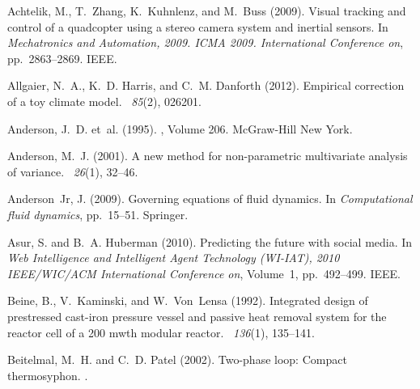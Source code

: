 \documentclass[12pt]{report}
\begin{document}

\begin{thebibliography}{}

Achtelik, M., T.~Zhang, K.~Kuhnlenz, and M.~Buss (2009).
\newblock Visual tracking and control of a quadcopter using a stereo camera
  system and inertial sensors.
\newblock In {\em Mechatronics and Automation, 2009. ICMA 2009. International
  Conference on}, pp.\  2863--2869. IEEE.

Allgaier, N.~A., K.~D. Harris, and C.~M. Danforth (2012).
\newblock Empirical correction of a toy climate model.
~{\em 85\/}(2), 026201.

Anderson, J.~D. et~al. (1995).
, Volume 206.
\newblock McGraw-Hill New York.

Anderson, M.~J. (2001).
\newblock A new method for non-parametric multivariate analysis of variance.
~{\em 26\/}(1), 32--46.

Anderson~Jr, J. (2009).
\newblock Governing equations of fluid dynamics.
\newblock In {\em Computational fluid dynamics}, pp.\  15--51. Springer.

Asur, S. and B.~A. Huberman (2010).
\newblock Predicting the future with social media.
\newblock In {\em Web Intelligence and Intelligent Agent Technology (WI-IAT),
  2010 IEEE/WIC/ACM International Conference on}, Volume~1, pp.\  492--499.
  IEEE.

Beine, B., V.~Kaminski, and W.~Von~Lensa (1992).
\newblock Integrated design of prestressed cast-iron pressure vessel and
  passive heat removal system for the reactor cell of a 200 mwth modular
  reactor.
~{\em 136\/}(1), 135--141.

Beitelmal, M.~H. and C.~D. Patel (2002).
\newblock Two-phase loop: Compact thermosyphon.
.


\end{thebibliography}
\end{document}
